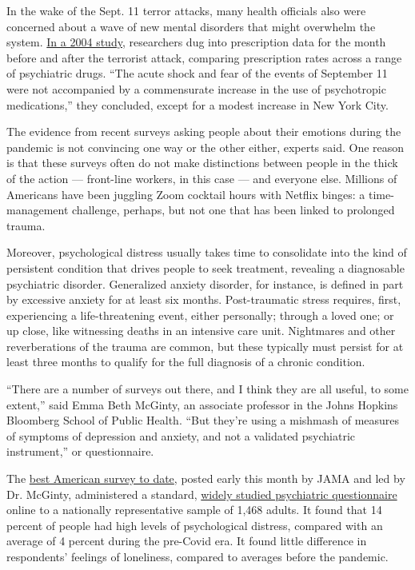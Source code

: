 In the wake of the Sept. 11 terror attacks, many health officials also
were concerned about a wave of new mental disorders that might overwhelm
the system.
\href{https://ajp.psychiatryonline.org/doi/pdf/10.1176/appi.ajp.161.8.1377}{In
a 2004 study,} researchers dug into prescription data for the month
before and after the terrorist attack, comparing prescription rates
across a range of psychiatric drugs. ``The acute shock and fear of the
events of September 11 were not accompanied by a commensurate increase
in the use of psychotropic medications,'' they concluded, except for a
modest increase in New York City.

The evidence from recent surveys asking people about their emotions
during the pandemic is not convincing one way or the other either,
experts said. One reason is that these surveys often do not make
distinctions between people in the thick of the action --- front-line
workers, in this case --- and everyone else. Millions of Americans have
been juggling Zoom cocktail hours with Netflix binges: a time-management
challenge, perhaps, but not one that has been linked to prolonged
trauma.

Moreover, psychological distress usually takes time to consolidate into
the kind of persistent condition that drives people to seek treatment,
revealing a diagnosable psychiatric disorder. Generalized anxiety
disorder, for instance, is defined in part by excessive anxiety for at
least six months. Post-traumatic stress requires, first, experiencing a
life-threatening event, either personally; through a loved one; or up
close, like witnessing deaths in an intensive care unit. Nightmares and
other reverberations of the trauma are common, but these typically must
persist for at least three months to qualify for the full diagnosis of a
chronic condition.

``There are a number of surveys out there, and I think they are all
useful, to some extent,'' said Emma Beth McGinty, an associate professor
in the Johns Hopkins Bloomberg School of Public Health. ``But they're
using a mishmash of measures of symptoms of depression and anxiety, and
not a validated psychiatric instrument,'' or questionnaire.

The
\href{https://jamanetwork.com/journals/jama/fullarticle/2766941?guestAccessKey=8b48ddf2-8b20-4aaf-8d21-1b201bc8f567\&utm_source=For_The_Media\&utm_medium=referral\&utm_campaign=ftm_links\&utm_content=tfl\&utm_term=060320}{best
American survey to date}, posted early this month by JAMA and led by Dr.
McGinty, administered a standard,
\href{https://www.hcp.med.harvard.edu/ncs/ftpdir/k6/Self\%20admin_K6.pdf}{widely
studied psychiatric questionnaire} online to a nationally representative
sample of 1,468 adults. It found that 14 percent of people had high
levels of psychological distress, compared with an average of 4 percent
during the pre-Covid era. It found little difference in respondents'
feelings of loneliness, compared to averages before the pandemic.

